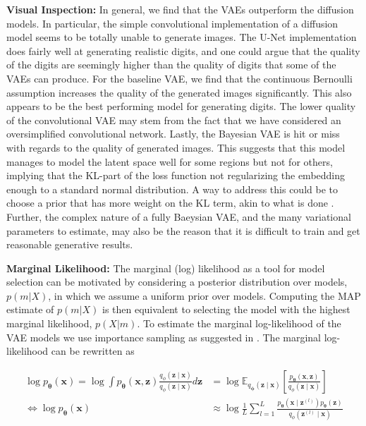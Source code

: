 \textbf{Visual Inspection:} In general, we find that the VAEs outperform the diffusion models. In particular, the simple convolutional implementation of a diffusion model seems to be totally unable to generate images. The U-Net implementation does fairly well at generating realistic digits, and one could argue that the quality of the digits are seemingly higher than the quality of digits that some of the VAEs can produce. For the baseline VAE, we find that the continuous Bernoulli assumption increases the quality of the generated images significantly. This also appears to be the best performing model for generating digits. The lower quality of the convolutional VAE may stem from the fact that we have considered an oversimplified convolutional network. 
Lastly, the Bayesian VAE is hit or miss with regards to the quality of generated images. This suggests that this model manages to model the latent space well for some regions but not for others, implying that the KL-part of the loss function not regularizing the embedding enough to a standard normal distribution. A way to address this could be to choose a prior that has more weight on the KL term, akin to what is done \cite{Higgins2016betaVAELB}. Further, the complex nature of a fully Baeysian VAE, and the many variational parameters to estimate, may also be the reason that it is difficult to train and get reasonable generative results.

\textbf{Marginal Likelihood:} The marginal (log) likelihood as a tool for model selection can be motivated by considering a posterior distribution over models, $p(m|X)$, in which we assume a uniform prior over models. Computing the MAP estimate of $p(m|X)$ is then equivalent to selecting the model with the highest marginal likelihood, $p(X|m)$. To estimate the marginal log-likelihood of the VAE models we use importance sampling as suggested in \cite{importancesampling}. The marginal log-likelihood can be rewritten as

\begin{align}
	\nonumber
	\log p_{\bm{\theta}}(\mathbf{x}) = \log \int p_{\bm{\theta}}(\mathbf{x}, \mathbf{z})
	\frac{q_{\phi}(\mathbf{z} \mid \mathbf{x})}{q_{\phi}(\mathbf{z} \mid \mathbf{x})}
	d \mathbf{z}                                                                                      
	                                 & =
	\nonumber
	\log \mathbb{E}_{q_{\bm{\phi}}(\mathbf{z} \mid  \mathbf{x})} \left[
		\frac{
			p_{\bm{\theta}}(\mathbf{x}, \mathbf{z})
		}{q_{\phi}(\mathbf{z} \mid \mathbf{x})}
	\right]                                                                                             \\
	\label{IS-VAE}
	\Leftrightarrow
	\log p_{\bm{\theta}}(\mathbf{x}) & \approx
	\log \frac{1}{L} \sum_{l=1}^{L}
	\frac{
		p_{\bm{\theta}}(\mathbf{x} \mid  \mathbf{z}^{(l)}) p_{\bm{\theta}}(\mathbf{z})
	}{
		q_{\phi}(\mathbf{z}^{(l)} \mid \mathbf{x})
	}
\end{align}

